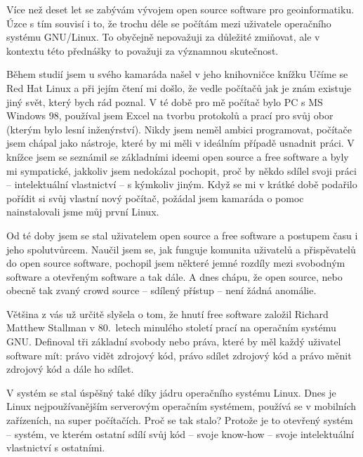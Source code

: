 \documentclass[twoside]{oss-conf}
\begin{document}
\maketitle
\bigskip

Více než deset let se zabývám vývojem open source software
pro geoinformatiku. Úzce s tím souvisí i to, že trochu déle se počítám mezi
uživatele operačního systému GNU/Linux. To obyčejně nepovažuji za důležité
zmiňovat, ale v kontextu této přednášky to považuji za významnou skutečnost.

Během studií jsem u svého kamaráda našel v jeho knihovničce knížku Učíme se Red Hat Linux
a při jejím čtení mi došlo, že vedle počítačů jak je znám existuje jiný
svět, který bych rád poznal. V té době pro mě počítač bylo PC s MS Windows 98,
používal jsem Excel na tvorbu protokolů a prací pro svůj obor (kterým bylo lesní
inženýrství). Nikdy jsem neměl ambici programovat, počítače jsem chápal jako
nástroje, které by mi měli v ideálním případě usnadnit práci. V knížce jsem se
seznámil se základními ideemi open source a free software a byly mi sympatické,
jakkoliv jsem nedokázal pochopit, proč by někdo sdílel svoji práci --
intelektuální vlastnictví -- s kýmkoliv jiným. Když se mi v krátké době podařilo
pořídit si svůj vlastní nový počítač, požádal jsem kamaráda o pomoc
nainstalovali jsme můj první Linux. 

Od té doby jsem se stal uživatelem open source a free software a postupem času i
jeho spolutvůrcem. Naučil jsem se, jak funguje komunita uživatelů a přispěvatelů
do open source software, pochopil jsem některé jemné rozdíly mezi svobodným
software a otevřeným software a tak dále. A dnes chápu, že open source, nebo
obecně tak zvaný crowd source -- sdílený přístup -- není žádná anomálie.

Většina z vás už určitě slyšela o tom, že hnutí free software založil Richard
Matthew Stallman v 80.~letech minulého století prací na operačním systému GNU.
Definoval tři základní svobody nebo práva, které by měl každý uživatel software
mít: právo vidět zdrojový kód, právo sdílet zdrojový kód a právo měnit zdrojový
kód a dále ho sdílet.

V systém se stal úspěšný také díky jádru operačního systému Linux. Dnes je Linux
nejpoužívanějším serverovým operačním systémem, používá se v mobilních
zařízeních, na super počítačích. Proč se tak stalo? Protože je to otevřený systém
-- systém, ve kterém ostatní sdílí svůj kód -- svoje know-how -- svoje
 intelektuální vlastnictví s ostatními.
\end{document}
